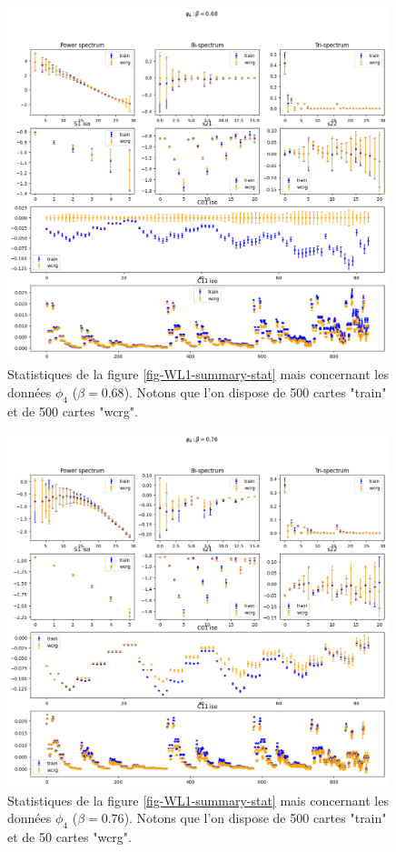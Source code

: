 \documentclass[12pt,twoside]{article}
\begin{document}
\begin{figure}
\centering
\includegraphics[width=0.99\textwidth]{fig-phi4-b068-summary-stat.png}
\caption{Statistiques de la figure \ref{fig-WL1-summary-stat} mais concernant les données $\phi_4$ ($\beta=0.68$). Notons que l'on dispose de 500 cartes "train" et de 500 cartes "wcrg".}
\label{fig-phi4-b068-summary-stat}
\end{figure}

\begin{figure}
\centering
\includegraphics[width=0.99\textwidth]{fig-phi4-b076-summary-stat.png}
\caption{Statistiques de la figure \ref{fig-WL1-summary-stat} mais concernant les données $\phi_4$ ($\beta=0.76$). Notons que l'on dispose de 500 cartes "train" et de 50 cartes "wcrg".}
\label{fig-phi4-b076-summary-stat}
\end{figure}
\end{document}
